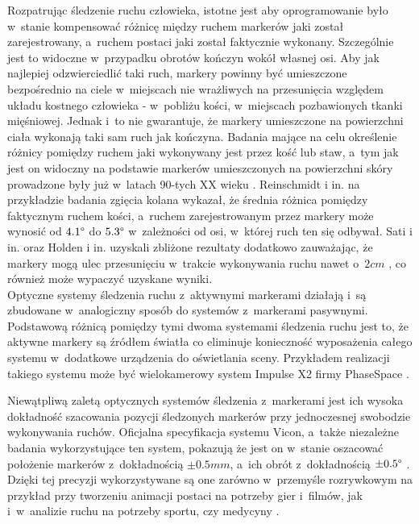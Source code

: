 Rozpatrując śledzenie ruchu człowieka, istotne jest aby oprogramowanie było w~stanie kompensować różnicę między ruchem markerów jaki został zarejestrowany, a~ruchem postaci jaki został faktycznie wykonany. Szczególnie jest to widoczne w~przypadku obrotów kończyn wokół własnej osi. Aby jak najlepiej odzwierciedlić taki ruch, markery powinny być umieszczone bezpośrednio na ciele w~miejscach nie wrażliwych na przesunięcia względem układu kostnego człowieka - w~pobliżu kości, w~miejscach pozbawionych tkanki mięśniowej. Jednak i~to nie gwarantuje, że markery umieszczone na powierzchni ciała wykonają taki sam ruch jak kończyna. Badania mające na celu określenie różnicy pomiędzy ruchem jaki wykonywany jest przez kość lub staw, a~tym jak jest on widoczny na podstawie markerów umieszczonych na powierzchni skóry prowadzone były już w~latach 90-tych XX wieku \cite{Sati2016,Reinschmidt2016,Holden2016}. Reinschmidt i in. \cite{Reinschmidt2016} na przykładzie badania zgięcia kolana wykazał, że średnia różnica pomiędzy faktycznym ruchem kości, a~ruchem zarejestrowanym przez markery może wynosić od $4.1\degree$ do $5.3\degree$ w~zależności od osi, w~której ruch ten się odbywał. Sati i in. \cite{Sati2016} oraz Holden i in. \cite{Holden2016} uzyskali zbliżone rezultaty dodatkowo zauważając, że markery mogą ulec przesunięciu w~trakcie wykonywania ruchu nawet o~$2cm$ \cite{Sati2016}, co również może wypaczyć uzyskane wyniki.\\ 
			
Optyczne systemy śledzenia ruchu z~aktywnymi markerami działają i~są zbudowane w~analogiczny sposób do systemów z~markerami pasywnymi. Podstawową różnicą pomiędzy tymi dwoma systemami śledzenia ruchu jest to, że aktywne markery są źródłem światła co eliminuje konieczność wyposażenia całego systemu w~dodatkowe urządzenia do oświetlania sceny. Przykładem realizacji takiego systemu może być wielokamerowy system Impulse X2 firmy PhaseSpace .
			
Niewątpliwą zaletą optycznych systemów śledzenia z~markerami jest ich wysoka dokładność szacowania pozycji śledzonych markerów przy jednoczesnej swobodzie wykonywania ruchów. Oficjalna specyfikacja systemu Vicon, a~także niezależne badania wykorzystujące ten system, pokazują że jest on w~stanie oszacować położenie markerów z~dokładnością $\pm0.5mm$, a~ich obrót z~dokładnością $\pm0.5 \degree$  \cite{Windolf2008}. Dzięki tej precyzji wykorzystywane są one zarówno w~przemyśle rozrywkowym na przykład przy tworzeniu animacji postaci na potrzeby gier i~filmów, jak i~w~analizie ruchu na potrzeby sportu, czy medycyny . 
			
